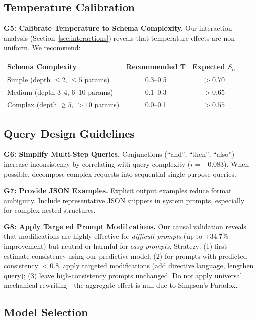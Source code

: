 \documentclass[sigconf,anonymous,review]{acmart}
\begin{document}
\subsection{Temperature Calibration}

\textbf{G5: Calibrate Temperature to Schema Complexity.} Our interaction analysis (Section~\ref{sec:interactions}) reveals that temperature effects are non-uniform. We recommend:

\begin{center}
\small
\begin{tabular}{@{}lcc@{}}
\toprule
\textbf{Schema Complexity} & \textbf{Recommended T} & \textbf{Expected $S_\alpha$} \\
\midrule
Simple (depth $\leq 2$, $\leq 5$ params) & 0.3--0.5 & $>0.70$ \\
Medium (depth 3--4, 6--10 params) & 0.1--0.3 & $>0.65$ \\
Complex (depth $\geq 5$, $>10$ params) & 0.0--0.1 & $>0.55$ \\
\bottomrule
\end{tabular}
\end{center}

\subsection{Query Design Guidelines}

\textbf{G6: Simplify Multi-Step Queries.} Conjunctions (``and'', ``then'', ``also'') increase inconsistency by correlating with query complexity ($r = -0.083$). When possible, decompose complex requests into sequential single-purpose queries.

\textbf{G7: Provide JSON Examples.} Explicit output examples reduce format ambiguity. Include representative JSON snippets in system prompts, especially for complex nested structures.

\textbf{G8: Apply Targeted Prompt Modifications.} Our causal validation reveals that modifications are highly effective for \textit{difficult prompts} (up to +34.7\% improvement) but neutral or harmful for \textit{easy prompts}. Strategy: (1) first estimate consistency using our predictive model; (2) for prompts with predicted consistency $<0.8$, apply targeted modifications (add directive language, lengthen query); (3) leave high-consistency prompts unchanged. Do not apply universal mechanical rewriting---the aggregate effect is null due to Simpson's Paradox.

\subsection{Model Selection}
\end{document}

